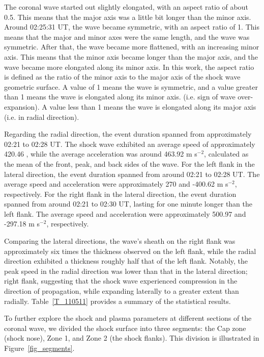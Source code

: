 The coronal wave started out slightly elongated, with an aspect ratio of about 0.5. This means that the major axis was a little bit longer than the minor axis. Around 02:25:31 UT, the wave became symmetric, with an aspect ratio of 1. This means that the major and minor axes were the same length, and the wave was symmetric. After that, the wave became more flattened, with an increasing minor axis. This means that the minor axis became longer than the major axis, and the wave became more elongated along its minor axis. In this work, the aspect ratio is defined as the ratio of the minor axis to the major axis of the shock wave geometric surface. A value of 1 means the wave is symmetric, and a value greater than 1 means the wave is elongated along its minor axis. (i.e. sign of wave over-expansion). A value less than 1 means the wave is elongated along its major axis (i.e. in radial direction).

Regarding the radial direction, the event duration spanned from approximately 02:21 to 02:28 UT. The shock wave exhibited an average speed of approximately 420.46 \kms, while the average acceleration was around 463.92 m s$^{-2}$, calculated as the mean of the front, peak, and back sides of the wave. For the left flank in the lateral direction, the event duration spanned from around 02:21 to 02:28 UT. The average speed and acceleration were approximately 270 \kms and -400.62 m s$^{-2}$, respectively. For the right flank in the lateral direction, the event duration spanned from around 02:21 to 02:30 UT, lasting for one minute longer than the left flank. The average speed and acceleration were approximately 500.97 \kms and -297.18 m s$^{-2}$, respectively.

Comparing the lateral directions, the wave's sheath on the right flank was approximately six times the thickness observed on the left flank, while the radial direction exhibited a thickness roughly half that of the left flank. Notably, the peak speed in the radial direction was lower than that in the lateral direction; right flank, suggesting that the shock wave experienced compression in the direction of propagation, while expanding laterally to a greater extent than radially. Table~\ref{T_110511} provides a summary of the statistical results.

To further explore the shock and plasma parameters at different sections of the coronal wave, we divided the shock surface into three segments: the Cap zone (shock nose), Zone 1, and Zone 2 (the shock flanks). This division is illustrated in Figure~\ref{fig_segments}.

